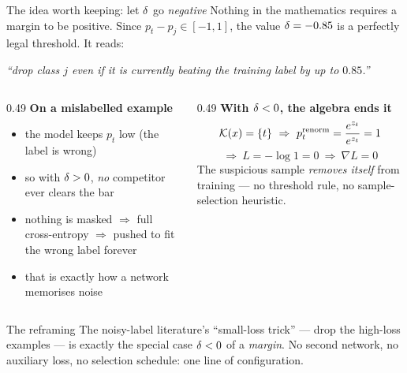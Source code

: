 \begin{frame}{The idea worth keeping: let $\delta$ go \emph{negative}}
  \small
  Nothing in the mathematics requires a margin to be positive. Since
  $p_t - p_j \in [-1, 1]$, the value $\delta = -0.85$ is a perfectly legal
  threshold. It reads:
  \begin{center}
    \emph{``drop class $j$ even if it is currently beating the training label by up to $0.85$.''}
  \end{center}
  \begin{columns}[T]
    \begin{column}{0.49\textwidth}
      \textbf{On a mislabelled example}
      \begin{itemize}\setlength\itemsep{0.15em}
        \item the model keeps $p_t$ low (the label is wrong)
        \item so with $\delta > 0$, \emph{no} competitor ever clears the bar
        \item nothing is masked $\Rightarrow$ full cross-entropy $\Rightarrow$
              pushed to fit the wrong label forever
        \item \alert{that is exactly how a network memorises noise}
      \end{itemize}
    \end{column}
    \begin{column}{0.49\textwidth}
      \textbf{With $\delta < 0$, the algebra ends it}
      \[ \keep(x) = \{t\} \ \Rightarrow\ p_t^{\text{renorm}} = \frac{e^{z_t}}{e^{z_t}} = 1 \]
      \[ \Rightarrow\ L = -\log 1 = 0 \ \Rightarrow\ \nabla L = 0 \]
      The suspicious sample \emph{removes itself} from training --- no threshold
      rule, no sample-selection heuristic.
    \end{column}
  \end{columns}
  \begin{alertblock}{The reframing}
    The noisy-label literature's ``small-loss trick'' --- drop the
    high-loss examples --- is exactly the special case $\delta < 0$ of a
    \emph{margin}. No second network, no auxiliary loss, no selection
    schedule: one line of configuration.
  \end{alertblock}
\end{frame}
